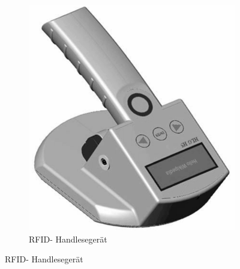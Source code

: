 \begin{figure} [h]
%         
\qquad
%
         \begin{subfigure}[h]{0.4\textwidth}
                 \centering
                 \includegraphics[width=\textwidth]{img/RFID-Reader_gs.png}
                 \vspace{.1cm}
                 \caption{ RFID- Handlesegerät }
                 \label{fig:READER}
         \end{subfigure}
\end{figure}
%
\label{sec:Measurement1}
%
